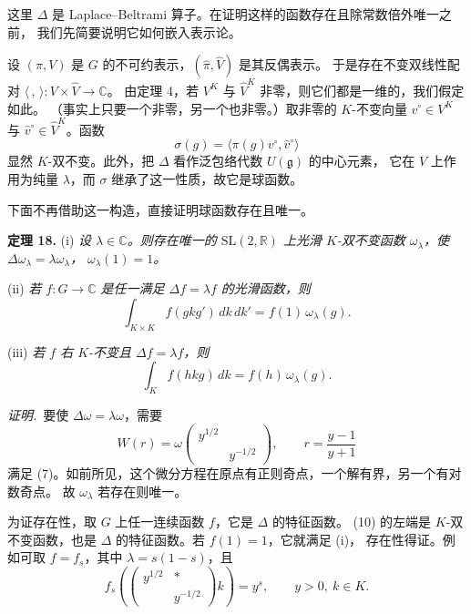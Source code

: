 这里 $\Delta$ 是 Laplace--Beltrami 算子。在证明这样的函数存在且除常数倍外唯一之前，
我们先简要说明它如何嵌入表示论。

设 $(\pi,V)$ 是 $G$ 的不可约表示，$(\hat\pi,\hat V)$ 是其反偶表示。
于是存在不变双线性配对 $\langle\,,\,\rangle:V\times\hat V\to\mathbb{C}$。
由定理 4，若 $V^{K}$ 与 $\hat V^{K}$ 非零，则它们都是一维的，我们假定如此。
（事实上只要一个非零，另一个也非零。）取非零的 $K$-不变向量
$v^{\circ}\in V^{K}$ 与 $\hat v^{\circ}\in\hat V^{K}$。函数
\[
\sigma(g)=\langle\pi(g)v^{\circ},\hat v^{\circ}\rangle
\]
显然 $K$-双不变。此外，把 $\Delta$ 看作泛包络代数 $U(\mathfrak{g})$ 的中心元素，
它在 $V$ 上作用为纯量 $\lambda$，而 $\sigma$ 继承了这一性质，故它是球函数。

下面不再借助这一构造，直接证明球函数存在且唯一。

\par\medskip\noindent\textbf{定理 18.}\quad
(i) \emph{设 $\lambda\in\mathbb{C}$。则存在唯一的 $\mathrm{SL}(2,\mathbb{R})$ 上光滑
$K$-双不变函数 $\omega_{\lambda}$，使 $\Delta\omega_{\lambda}=\lambda\omega_{\lambda}$，
$\omega_{\lambda}(1)=1$。}

(ii) \emph{若 $f:G\to\mathbb{C}$ 是任一满足 $\Delta f=\lambda f$ 的光滑函数，则}
\begin{equation}\tag{10}
\int_{K\times K}f(gkg')\,dk\,dk'=f(1)\,\omega_{\lambda}(g).
\end{equation}

(iii) \emph{若 $f$ 右 $K$-不变且 $\Delta f=\lambda f$，则}
\begin{equation}\tag{11}
\int_{K}f(hkg)\,dk=f(h)\,\omega_{\lambda}(g).
\end{equation}

\smallskip
\noindent\emph{证明.}\ 要使 $\Delta\omega=\lambda\omega$，需要
\[
W(r)=\omega\begin{pmatrix}y^{1/2}&\\&y^{-1/2}\end{pmatrix},
\qquad r=\frac{y-1}{y+1}
\]
满足 (7)。如前所见，这个微分方程在原点有正则奇点，一个解有界，另一个有对数奇点。
故 $\omega_{\lambda}$ 若存在则唯一。

为证存在性，取 $G$ 上任一连续函数 $f$，它是 $\Delta$ 的特征函数。
(10) 的左端是 $K$-双不变函数，也是 $\Delta$ 的特征函数。若 $f(1)=1$，它就满足 (i)，
存在性得证。例如可取 $f=f_{s}$，其中 $\lambda=s(1-s)$，且
\begin{equation}\tag{12}
f_{s}\!\left(\begin{pmatrix}y^{1/2}&*\\&y^{-1/2}\end{pmatrix}k\right)=y^{s},
\qquad y>0,\ k\in K .
\end{equation}

